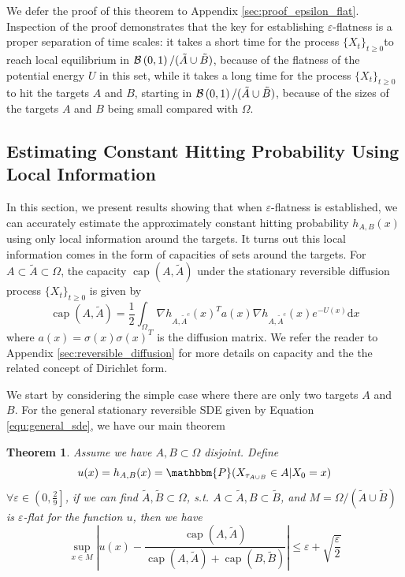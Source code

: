 \documentclass[english, aip, jcp, priprint, graphicx]{revtex4-1}
\newtheorem{theorem}{Theorem}
\theoremstyle{plain}
\theoremstyle{definition}
\theoremstyle{plain}
\begin{document}
We defer the proof of this theorem to Appendix \ref{sec:proof_epsilon_flat}. Inspection of the proof demonstrates that the key for establishing $\varepsilon$-flatness is a proper separation of time scales: it takes a short time for the process $\{X_t\}_{t\geq 0}$to reach local equilibrium in $\mathcal{B}\left(0, 1\right) / (\tilde{A} \cup \tilde{B})$, because of the flatness of the potential energy $U$ in this set, while it takes a long time for the process $\{X_t\}_{t\geq 0}$ to hit the targets $A$ and $B$, starting in $\mathcal{B}\left(0, 1\right) / (\tilde{A} \cup \tilde{B})$, because of the sizes of the targets $A$ and $B$ being small compared with $\Omega$.

\subsection{Estimating Constant Hitting Probability Using Local Information}

In this section, we present results showing that when $\varepsilon$-flatness is established, we can accurately estimate the approximately constant hitting probability $h_{A, B}(x)$ using only local information around the targets. It turns out this local information comes in the form of capacities of sets around the targets. For $A \subset \tilde{A} \subset \Omega$, the capacity
$\ensuremath{\operatorname{cap}} (A, \tilde{A})$ under the stationary reversible diffusion process $\{X_t\}_{t\geq 0}$ is given by
\[ \ensuremath{\operatorname{cap}} (A, \tilde{A}) = \frac{1}{2} \int_{\Omega}
\nabla h_{A, \tilde{A}^c} (x)^T a (x) \nabla h_{A, \tilde{A}^c} (x) e^{- U
(x)} \mathrm{d} x \]
where $a (x) = \sigma (x) \sigma (x)^T$ is the diffusion matrix. We refer the reader to Appendix \ref{sec:reversible_diffusion} for more details on capacity and the the related concept of Dirichlet form.

We start by considering the simple case where there are only two targets $A$ and $B$. For the general stationary reversible SDE given by Equation \ref{equ:general_sde}, we have our main theorem

\begin{theorem}\label{thm:main_thm}
Assume we have $A, B \subset \Omega$ disjoint. Define
\[ u (x) = h_{A, B}(x) = \mathbbm{P} (X_{\tau_{A \cup B}} \in A|X_0 = x) \]
$\forall \varepsilon \in \left( 0, \frac{2}{9} \right]$, if we can find
$\tilde{A}, \tilde{B} \subset \Omega$, s.t. $A \subset \tilde{A}, B \subset
\tilde{B}$, and $M = \Omega / (\tilde{A} \cup \tilde{B})$ is $\varepsilon$-flat
for the function $u$, then we have
\[ \sup_{x \in M} \left| u (x) - \frac{\ensuremath{\operatorname{cap}} (A,
\tilde{A})}{\ensuremath{\operatorname{cap}} (A, \tilde{A})
+\ensuremath{\operatorname{cap}} (B, \tilde{B})} \right| \leqslant
\varepsilon + \sqrt{\frac{\varepsilon}{2}} \]
\end{theorem}
\end{document}
